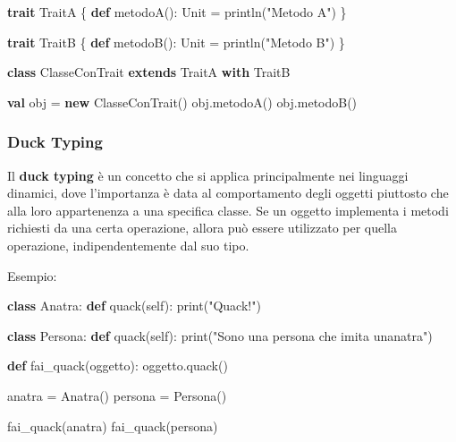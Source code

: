 \documentclass[
  letterpaper,
]{scrbook}
\newenvironment{Shaded}{\begin{snugshade}}{\end{snugshade}}
\newcommand{\BuiltInTok}[1]{\textcolor[rgb]{0.00,0.23,0.31}{#1}}
\newcommand{\FunctionTok}[1]{\textcolor[rgb]{0.28,0.35,0.67}{#1}}
\newcommand{\KeywordTok}[1]{\textcolor[rgb]{0.00,0.23,0.31}{\textbf{#1}}}
\newcommand{\NormalTok}[1]{\textcolor[rgb]{0.00,0.23,0.31}{#1}}
\newcommand{\OperatorTok}[1]{\textcolor[rgb]{0.37,0.37,0.37}{#1}}
\newcommand{\StringTok}[1]{\textcolor[rgb]{0.13,0.47,0.30}{#1}}
\newcommand{\VariableTok}[1]{\textcolor[rgb]{0.07,0.07,0.07}{#1}}
\begin{document}
\begin{Shaded}
\begin{Highlighting}[]
\KeywordTok{trait}\NormalTok{ TraitA }\OperatorTok{\{}
    \KeywordTok{def} \FunctionTok{metodoA}\OperatorTok{():} \BuiltInTok{Unit} \OperatorTok{=} \FunctionTok{println}\OperatorTok{(}\StringTok{"Metodo A"}\OperatorTok{)}
\OperatorTok{\}}

\KeywordTok{trait}\NormalTok{ TraitB }\OperatorTok{\{}
    \KeywordTok{def} \FunctionTok{metodoB}\OperatorTok{():} \BuiltInTok{Unit} \OperatorTok{=} \FunctionTok{println}\OperatorTok{(}\StringTok{"Metodo B"}\OperatorTok{)}
\OperatorTok{\}}

\KeywordTok{class}\NormalTok{ ClasseConTrait }\KeywordTok{extends}\NormalTok{ TraitA }\KeywordTok{with}\NormalTok{ TraitB}

\KeywordTok{val}\NormalTok{ obj }\OperatorTok{=} \KeywordTok{new} \FunctionTok{ClasseConTrait}\OperatorTok{()}
\NormalTok{obj}\OperatorTok{.}\FunctionTok{metodoA}\OperatorTok{()}
\NormalTok{obj}\OperatorTok{.}\FunctionTok{metodoB}\OperatorTok{()}
\end{Highlighting}
\end{Shaded}

\subsubsection{Duck Typing}\label{duck-typing}

Il \textbf{duck typing} è un concetto che si applica principalmente nei
linguaggi dinamici, dove l'importanza è data al comportamento degli
oggetti piuttosto che alla loro appartenenza a una specifica classe. Se
un oggetto implementa i metodi richiesti da una certa operazione, allora
può essere utilizzato per quella operazione, indipendentemente dal suo
tipo.

Esempio:

\begin{Shaded}
\begin{Highlighting}[]
\KeywordTok{class}\NormalTok{ Anatra:}
    \KeywordTok{def}\NormalTok{ quack(}\VariableTok{self}\NormalTok{):}
        \BuiltInTok{print}\NormalTok{(}\StringTok{"Quack!"}\NormalTok{)}

\KeywordTok{class}\NormalTok{ Persona:}
    \KeywordTok{def}\NormalTok{ quack(}\VariableTok{self}\NormalTok{):}
        \BuiltInTok{print}\NormalTok{(}\StringTok{"Sono una persona che imita un\textquotesingle{}anatra"}\NormalTok{)}

\KeywordTok{def}\NormalTok{ fai\_quack(oggetto):}
\NormalTok{    oggetto.quack()}

\NormalTok{anatra }\OperatorTok{=}\NormalTok{ Anatra()}
\NormalTok{persona }\OperatorTok{=}\NormalTok{ Persona()}

\NormalTok{fai\_quack(anatra)}
\NormalTok{fai\_quack(persona)}
\end{Highlighting}
\end{Shaded}
\end{document}
